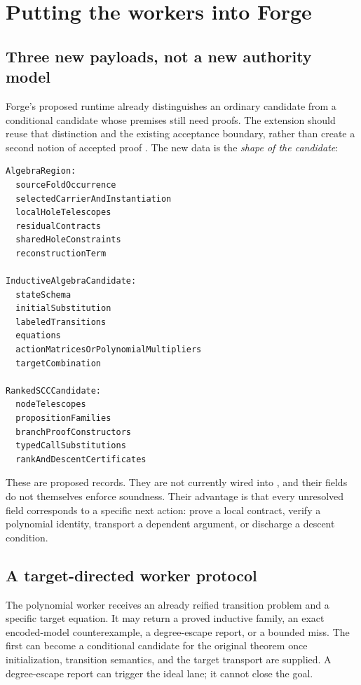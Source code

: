 \section{Putting the workers into Forge}
\label{sec:integration}

\subsection{Three new payloads, not a new authority model}

Forge's proposed runtime already distinguishes an ordinary candidate from a
conditional candidate whose premises still need proofs. The extension should
reuse that distinction and the existing acceptance boundary, rather than create
a second notion of accepted proof \cite{forge-runtime,forge-integration}.
The new data is the \emph{shape of the candidate}:
\begin{lstlisting}
AlgebraRegion:
  sourceFoldOccurrence
  selectedCarrierAndInstantiation
  localHoleTelescopes
  residualContracts
  sharedHoleConstraints
  reconstructionTerm

InductiveAlgebraCandidate:
  stateSchema
  initialSubstitution
  labeledTransitions
  equations
  actionMatricesOrPolynomialMultipliers
  targetCombination

RankedSCCCandidate:
  nodeTelescopes
  propositionFamilies
  branchProofConstructors
  typedCallSubstitutions
  rankAndDescentCertificates
\end{lstlisting}
These are proposed records. They are not currently wired into
, and their fields do not themselves enforce
soundness. Their advantage is that every unresolved field corresponds to a
specific next action: prove a local contract, verify a polynomial identity,
transport a dependent argument, or discharge a descent condition.

\subsection{A target-directed worker protocol}

The polynomial worker receives an already reified transition problem and a
specific target equation. It may return a proved inductive family, an exact
encoded-model counterexample, a degree-escape report, or a bounded miss. The
first can become a conditional candidate for the original theorem once
initialization, transition semantics, and the target transport are supplied.
A degree-escape report can trigger the ideal lane; it cannot close the goal.

